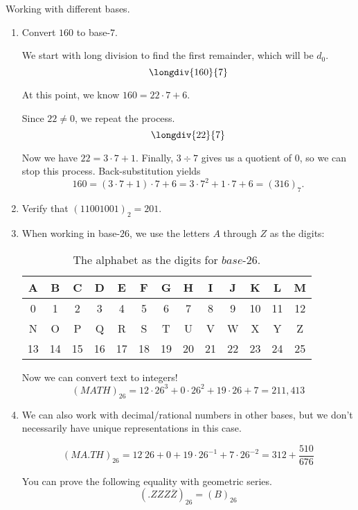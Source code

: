 \begin{example} Working with different bases.
\begin{enumerate}[(1)]
\item Convert $160$ to base-$7$.

We start with long division to find the first remainder, which will be $d_0$.
\[\longdiv{160}{7}\]

At this point, we know $160 = 22\cdot 7 + 6$.

Since $22 \not = 0$, we repeat the process.
\[\longdiv{22}{7}\]

Now we have $22 = 3 \cdot 7 + 1$.  Finally, $3 \div 7$ gives us a quotient of $0$, so we can stop this process.  Back-substitution yields
\[160 = (3\cdot 7 + 1)\cdot 7 + 6 = 3\cdot 7^2 + 1 \cdot 7 + 6 = (316)_7.\]

\item Verify that $(11001001)_2 = 201$.

\item When working in base-$26$, we use the letters $A$ through $Z$ as the digits:

\begin{table}[!h]\label{tab:base26digits}
\centering
\begin{small}
\begin{tabular}{|c|c|c|c|c|c|c|c|c|c|c|c|c|}
\hline
 A & B & C & D & E & F & G & H & I& J & K & L &M  \\
 \hline
0 & 1& 2 & 3 & 4 & 5 & 6 & 7 & 8 & 9 & 10 & 11 & 12 \\
\hline
\hline
N&O&P&Q&R&S&T&U&V&W&X&Y&Z\\
\hline
13 & 14 & 15 & 16 & 17 & 18 & 19 & 20 & 21 & 22 & 23 & 24 & 25\\
\hline
\end{tabular}
\caption{The alphabet as the digits for $base$-26.}
\end{small}
\end{table}

Now we can convert text to integers! \[
(MATH)_{26} = 12\cdot 26^3 + 0 \cdot 26^2 + 19\cdot26 + 7 = 211,413 \]

\item We can also work with decimal/rational numbers in other bases, but we don't necessarily have unique representations in this case.

\[(MA.TH)_{26} = 12^\cdot 26 + 0 + 19 \cdot 26^{-1} + 7 \cdot 26^{-2} = 312 + \frac{510}{676}\]

You can prove the following equality with geometric series.
\[(.ZZZ\overline{Z})_{26} = (B)_{26}\]

\end{enumerate}
\end{example}

